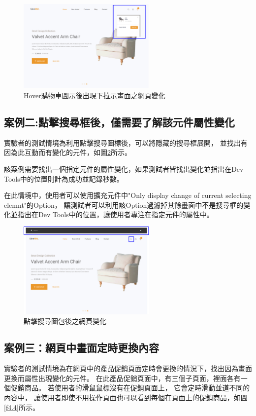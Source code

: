 \begin{figure}[H]
    \centering
    \includegraphics[width=0.6\textwidth]{picture/experiment/test-environment-no1.png}
    \caption{Hover購物車圖示後出現下拉示畫面之網頁變化}
    \label{f4.2}
\end{figure}

\subsection{案例二:點擊搜尋框後，僅需要了解該元件屬性變化}\label{s4.2.2}
\indent
實驗者的測試情境為利用點擊搜尋圖標後，可以將隱藏的搜尋框展開，
並找出有因為此互動而有變化的元件，如圖\ref{f4.3}所示。

該案例需要找出一個指定元件的屬性變化，如果測試者皆找出變化並指出在Dev Tools中的位置則計為成功並記錄秒數。

在此情境中，使用者可以使用擴充元件中"Only display change of current selecting elemnt"的Option，
讓測試者可以利用該Option過濾掉其餘畫面中不是搜尋框的變化並指出在Dev Tools中的位置，讓使用者專注在指定元件的屬性中。

\begin{figure}[H]
    \centering
    \includegraphics[width=0.6\textwidth]{picture/experiment/test-environment-no2.png}
    \caption{點擊搜尋圖包後之網頁變化}
    \label{f4.3}
\end{figure}

\subsection{案例三：網頁中畫面定時更換內容}\label{s4.2.3}
\indent
實驗者的測試情境為在網頁中的產品促銷頁面定時會更換的情況下，找出因為畫面更換而屬性出現變化的元件。
在此產品促銷頁面中，有三個子頁面，裡面各有一個促銷商品。
若使用者的滑鼠鼠標沒有在促銷頁面上，
它會定時滑動並道不同的內容中，
讓使用者即使不用操作頁面也可以看到每個在頁面上的促銷商品，如圖\ref{f4.4}所示。

